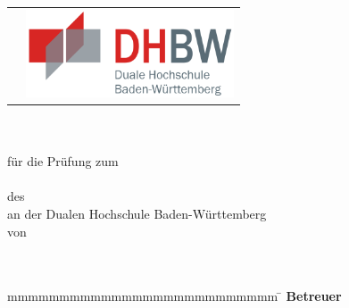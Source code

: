 
\begin{titlepage}
	\begin{longtable}{p{} p{}}
	  {} &
	  {\includegraphics[height=2.6cm]{images/dhbw.png}}
	\end{longtable}
	\enlargethispage{20mm}
	\begin{center}
	  \vspace*{12mm}	{\LARGE\bf \titel }\\
	  \vspace*{12mm}	{\large\bf \arbeit}\\
	  \vspace*{12mm}	für die Prüfung zum\\
	  \vspace*{3mm} 	{\bf \abschluss}\\
	  \vspace*{12mm}	des \studiengang\\
	  \vspace*{3mm} 	an der Dualen Hochschule Baden-Württemberg \dhbw\\
	  \vspace*{12mm}	von\\
	  \vspace*{3mm} 	{\large\bf \autor}\\
	  \vspace*{12mm}	\datumAbgabe\\
	\end{center}
	\vfill
	\begin{spacing}{1.2}
	\begin{tabbing}
		mmmmmmmmmmmmmmmmmmmmmmmmmm     \= \kill
		\textbf{Betreuer}              \>  \betreuer\\
	\end{tabbing}
	\end{spacing}
\end{titlepage}

